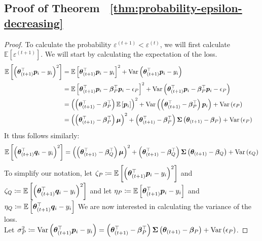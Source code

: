 \documentclass{article} %
\begin{document}
\begin{appendices}
	\subsection{Proof of Theorem ~\ref{thm:probability-epsilon-decreasing}}
	\label{app:decrease-of-epsilon}
	\begin{proof}
		To calculate the probability $\varepsilon^{(t+1)} < \varepsilon^{(t)}$, we will first calculate $\mathbb{E}\left[\varepsilon^{(t+1)}\right]$. We will start by calculating the expectation of the loss. 
		\begin{align*}
			\mathbb{E}\left[\left({\bm{\theta}}_{(t+1)}^\top{\bm{p}}_i - y_i\right)^2\right] &= \mathbb{E}\left[{\bm{\theta}}_{(t+1)}^\top{\bm{p}}_i - y_i\right]^2 + \mathrm{Var}\left({\bm{\theta}}_{(t+1)}^\top{\bm{p}}_i - y_i\right) &&\\
			&= \mathbb{E}\left[{\bm{\theta}}_{(t+1)}^\top{\bm{p}}_i - {\bm{\beta}}_P^\top{\bm{p}}_i - {\epsilon}_P\right]^2 + \mathrm{Var}\left({\bm{\theta}}_{(t+1)}^\top{\bm{p}}_i - {\bm{\beta}}_P^\top{\bm{p}}_i - {\epsilon}_P\right) &&\\
			&= \left(\left({\bm{\theta}}^\top_{(t+1)} - {\bm{\beta}}_P^\top\right)\mathbb{E}\left[{\bm{p}}_i\right]\right)^2 + \mathrm{Var}\left(\left({\bm{\theta}}^\top_{(t+1)}-{\bm{\beta}}_P^\top\right){\bm{p}}_i\right) + \mathrm{Var}\left({\epsilon}_P\right)	&&\\	
			&= \left(\left({\bm{\theta}}^\top_{(t+1)}-{\bm{\beta}}_P^\top\right){\bm{\mu}}\right)^2 + \left({\bm{\theta}}^\top_{(t+1)} - {\bm{\beta}}_P^\top\right){\bm{\Sigma}}\left({\bm{\theta}}_{(t+1)} - {\bm{\beta}}_P\right) + \mathrm{Var}\left({\epsilon}_P\right)
		\end{align*}
		It thus follows similarly:
		\begin{equation*}
			\mathbb{E}\left[\left({\bm{\theta}}_{(t+1)}^\top{\bm{q}}_i - y_i\right)^2\right] =  \left(\left({\bm{\theta}}^\top_{(t+1)}-{\bm{\beta}}_Q^\top\right){\bm{\mu}}\right)^2 + \left({\bm{\theta}}^\top_{(t+1)} - {\bm{\beta}}_Q^\top\right){\bm{\Sigma}}\left({\bm{\theta}}_{(t+1)} - {\bm{\beta}}_Q\right) + \mathrm{Var}\left({\epsilon}_Q\right)
		\end{equation*}
		To simplify our notation, let $\zeta_P \coloneqq \mathbb{E}\left[\left({\bm{\theta}}_{(t+1)}^\top{\bm{p}}_i - y_i\right)^2\right]$ and $\zeta_Q \coloneqq \mathbb{E}\left[\left({\bm{\theta}}_{(t+1)}^\top{\bm{q}}_i - y_i\right)^2\right]$ and let $\eta_P \coloneqq \mathbb{E}\left[{\bm{\theta}}_{(t+1)}^\top{\bm{p}}_i - y_i\right]$ and $\eta_Q \coloneqq \mathbb{E}\left[{\bm{\theta}}_{(t+1)}^\top{\bm{q}}_i - y_i\right]$
		We are now interested in calculating the variance of the loss. \\
		Let $\sigma^2_P \coloneqq \mathrm{Var}\left({\bm{\theta}}^\top_{(t+1)}{\bm{p}}_i - y_i\right) = \left({\bm{\theta}}^\top_{(t+1)} - {\bm{\beta}}_P^\top\right){\bm{\Sigma}}\left({\bm{\theta}}_{(t+1)} - {\bm{\beta}}_P\right) + \mathrm{Var}\left({\epsilon}_P\right)$. 

\end{proof}
\end{appendices}
\end{document}
